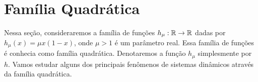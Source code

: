 \section{Família Quadrática}

Nessa seção, consideraremos a família de funções $h_\mu: \mathbb{R} \to \mathbb{R}$ dadas por $h_\mu(x) = \mu x(1-x)$,
onde $\mu > 1$ é um parâmetro real.
Essa família de funções é conhecia como família quadrática.
Denotaremos a função $h_\mu$ simplesmente por $h$.
Vamos estudar alguns dos principais fenômenos de sistemas dinâmicos através da família quadrática.
